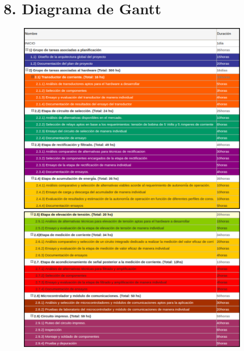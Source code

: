 \documentclass[11pt]{charter}
\begin{document}
\section{8. Diagrama de Gantt}
\label{sec:gantt}
\begin{figure}[H]
	\centering 
	\includegraphics[width=\textwidth]{./Figuras/gantt/inicio-24.png}
	\includegraphics[width=\textwidth]{./Figuras/gantt/25-29.png}
	\label{fig:tablegantt1}
\end{figure}
\end{document}

